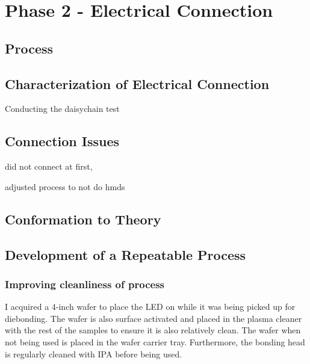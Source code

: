 \chapter{Phase 2 - Electrical Connection}
\label{sec:Ch3_elec}

\section{Process}

\section{Characterization of Electrical Connection}
Conducting the daisychain test

\section{Connection Issues}
did not connect at first,

adjusted process to not do hmds

\section{Conformation to Theory}
\section{Development of a Repeatable Process}


\subsection{Improving cleanliness of process}

I acquired a 4-inch wafer to place the LED on while it was being picked up for diebonding. The wafer is also surface activated and placed in the plasma cleaner with the rest of the samples to ensure it is also relatively clean. The wafer when not being used is placed in the wafer carrier tray. Furthermore, the bonding head is regularly cleaned with IPA before being used.
